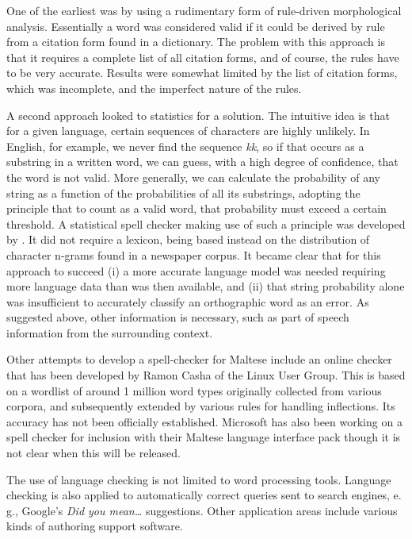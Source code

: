 \documentclass[]{../../metanetpaper}
\begin{document}
\begin{multicols}{2}
One of the earliest was by \cite{Mangion:1999} using a rudimentary form of rule-driven morphological analysis. Essentially a word was considered valid if it could be derived by rule from a citation form found in a dictionary. The problem with this approach is that it requires a complete list of all citation forms, and of course, the rules have to be very accurate. Results were somewhat limited by the list of citation forms, which was incomplete, and the imperfect nature of the rules.

A second approach looked to statistics for a solution. The intuitive idea is that for a given language, certain sequences of characters are highly unlikely. In English, for example, we never find the sequence \emph{kk}, so if that occurs as a substring in a written word, we can guess, with a high degree of confidence, that the word is not valid. More generally, we can calculate the probability of any string as a function of the probabilities of all its substrings, adopting the principle that to count as a valid word, that probability must exceed a certain threshold.
A statistical spell checker making use of such a principle was developed by \cite{Mizzi:2001}. It did not require a lexicon, being based instead on the distribution of character n-grams found in a newspaper corpus. It became clear that for this approach to succeed (i) a more accurate language model was needed requiring more language data than was then available, and (ii) that string probability alone was insufficient to accurately classify an orthographic word as an error. As suggested above, other information is necessary, such as part of speech information from the surrounding context.

Other attempts to develop a spell-checker for Maltese include an online checker that has been developed by Ramon Casha of the Linux User Group\cite{Linux-spellcheck1}.  This is based on a wordlist of around 1 million word types originally collected from various corpora, and subsequently extended by various rules for handling inflections. Its accuracy has not been officially established. Microsoft has also been working on a spell checker for inclusion with their Maltese language interface pack though it is not clear when this will be released.

The use of language checking is not limited to word processing tools. Language checking is also applied to automatically correct queries sent to search engines, e.\,g., Google’s \emph{Did you mean…} suggestions. Other application areas include various kinds of authoring support software. 


\end{multicols}
\end{document}
